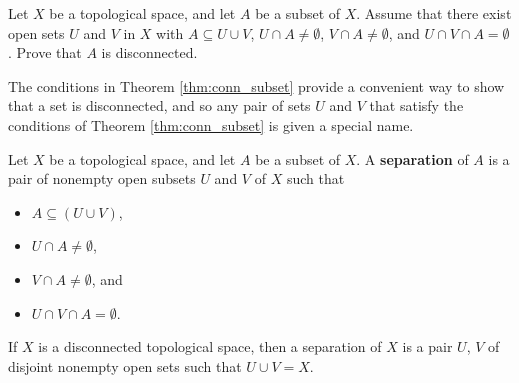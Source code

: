 \begin{activity} Let $X$ be a topological space, and let $A$ be a subset of $X$. Assume that there exist  open sets $U$ and $V$ in $X$ with $A \subseteq U \cup V$, $U \cap A \neq \emptyset$,  $V \cap A \neq \emptyset$, and $U \cap V \cap A = \emptyset$. Prove that $A$ is disconnected. 

\end{activity}

\begin{comment}

\ActivitySolution For the reverse implication, assume that there exist open sets $U$ and $V$ in $X$ with $A \subseteq U \cup V$, $U \cap A \neq \emptyset$,  $V \cap A \neq \emptyset$, and $U \cap V \cap A = \emptyset$. Let $U' = U \cap A$ and $V' = V \cap A$. By construction, $U' \neq \emptyset$ and $V' \neq \emptyset$. Also,
\[U' \cap V' = (U \cap A) \cap (V \cap A) = U \cap V \cap A = \emptyset.\]
Since $U$ and $V$ are open in $X$, we know that $U'$ and $V'$ are open in $A$. To complete the proof that $A$ is disconnected, it remains to show that $A = U' \cup V'$. Since $A \subseteq U \cup V$, it follows that 
\[A = (U \cup V) \cap A = (U \cap A) \cup (V \cap A) = U' \cup V'.\]
Therefore, $A$ is a disconnected set.

\end{comment}

The conditions in Theorem \ref{thm:conn_subset} provide a convenient way to show that a set is disconnected, and so any pair of sets $U$ and $V$ that satisfy the conditions of Theorem \ref{thm:conn_subset} is given a special name.

\begin{definition} Let $X$ be a topological space, and let $A$ be a subset of $X$. A \textbf{separation} of $A$ is a pair of nonempty open subsets $U$ and $V$ of $X$ such that 
\begin{itemize}
\item $A \subseteq (U \cup V)$,
\item $U \cap A \neq \emptyset$, 
\item $V \cap A \neq \emptyset$, and
\item $U \cap V \cap A = \emptyset$.
\end{itemize}
\end{definition}

If $X$ is a disconnected topological space, then a separation of $X$ is a pair $U$, $V$ of disjoint nonempty open sets such that $U \cup V = X$. 

